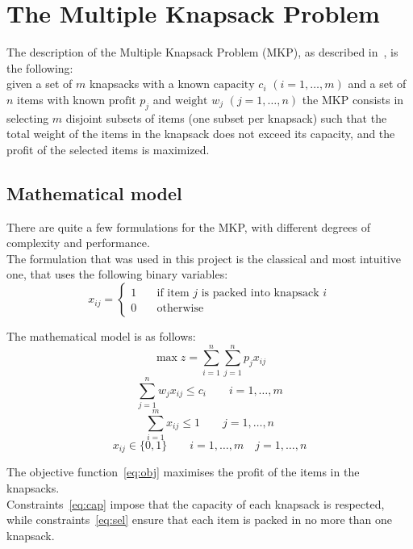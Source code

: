 \chapter{The Multiple Knapsack Problem}
The description of the Multiple Knapsack Problem (MKP), as described in~\cite{mkp:2019}, is the following:\\
given a set of \(m\) knapsacks with a known \(\text{capacity } c_{i}\) \((i=1,\dots,m)\) and a set of \(n\) items with
known \(\text{profit } p_{j}\) and \(\text{weight } w_{j}\) \((j=1,\dots,n)\) the MKP consists in
selecting \(m\) disjoint subsets of items (one subset per knapsack) such that the total weight of the items in the knapsack
does not exceed its capacity, and the profit of the selected items is maximized.

\section{Mathematical model}
There are quite a few formulations for the MKP, with different degrees of
complexity and performance.\\
The formulation that was used in this project is the classical and most intuitive
one, that uses the following binary variables:
\[x_{ij}=
\begin{cases}
    1 & \quad \text{if item } j \text{ is packed into knapsack } i\\
    0 & \quad \text{otherwise}
\end{cases}
\]

The mathematical model is as follows:
\begin{equation}
    \label{eq:obj}
    \max{z} = \sum_{i=1}^{n} \sum_{j=1}^{n} p_{j} x_{ij}
\end{equation}
\begin{equation}
    \label{eq:cap}
    \sum_{j=1}^{n} w_{j} x_{ij} \leq c_{i} \qquad i=1,\dots,m
\end{equation}
\begin{equation}
    \label{eq:sel}
    \sum_{i=1}^{m} x_{ij} \leq 1 \qquad j=1,\dots,n
\end{equation}
\begin{equation}
    x_{ij} \in \{0,1\} \qquad i=1,\dots,m \quad j=1,\dots,n
\end{equation}

The objective function~\eqref{eq:obj} maximises the profit of the items in the knapsacks.\\
Constraints~\eqref{eq:cap} impose that the capacity of each knapsack is respected, while constraints~\eqref{eq:sel}
ensure that each item is packed in no more than one knapsack.

